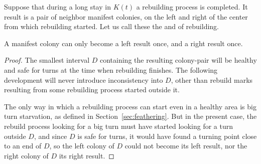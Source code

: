 \documentclass[11pt]{memoir}
\theoremstyle{definition} %
\begin{document}
  \begin{lemma}\label{lem:escape.results}
    Suppose that during a long stay in \( K(t) \) a rebuilding process is completed.
  It result is a pair of neighbor manifest colonies, on the left and right of the
  center from which rebuilding started.
  Let us call these the  and  of rebuilding.

  A manifest colony can only become a left result once, and a right result once.
\end{lemma}
\begin{proof}
  The smallest interval \( D \) containing the resulting colony-pair will be healthy and safe
  for turns at the time when rebuilding finishes.
  The following development will never introduce inconsistency into \( D \),
  other than rebuild marks resulting from some rebuilding process started outside it.

  The only way in which a rebuilding process can start even in a healthy area is
  big turn starvation, as defined in Section~\ref{sec:feathering}.
  But in the present case, the rebuild process looking for a big turn must have started
  looking for a turn outside \( D \), and since \( D \) is safe for turns, it would have
  found a turning point close to an end of \( D \), so the left colony of \( D \) could not become
  its left result, nor the right colony of \( D \) its right result.
\end{proof}
\end{document}
